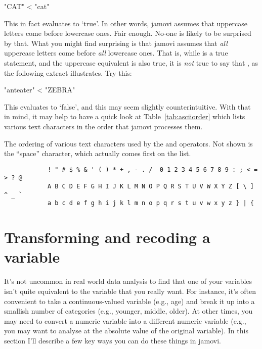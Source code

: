 \begin{rblock1}
"CAT" < "cat"
\end{rblock1}
This in fact evaluates to `true'. In other words, jamovi assumes that uppercase letters come before lowercase ones. Fair enough. No-one is likely to be surprised by that. What you might find surprising is that jamovi assumes that {\it all} uppercase letters come before {\it all} lowercase ones. That is, while  is a true statement, and the uppercase equivalent  is also true, it is {\it not} true to say that , as the following extract illustrates. Try this: 
\begin{rblock1}
"anteater" < "ZEBRA"
\end{rblock1}
This evaluates to `false', and this may seem slightly counterintuitive. With that in mind, it may help to have a quick look at Table~\ref{tab:asciiorder} which lists various text characters in the order that jamovi processes them. 

\begin{table}
\begin{center}
\caption{The ordering of various text characters used by the \rtext{<} and \rtext{>} operators. Not shown is the ``space'' character, which actually comes first on the list.}\tabcapsep
\label{tab:asciiorder}
\begin{verbatim}
            ! " # $ % & ' ( ) * + , - . /  0 1 2 3 4 5 6 7 8 9 : ; < = > ? @ 
            A B C D E F G H I J K L M N O P Q R S T U V W X Y Z [ \ ]  ^ _ ` 
            a b c d e f g h i j k l m n o p q r s t u v w x y z } | {
\end{verbatim}
\HR
\end{center}
\end{table}


\section{Transforming and recoding a variable~\label{sec:transform}}

It's not uncommon in real world data analysis to find that one of your variables isn't quite equivalent to the variable that you really want. For instance, it's often convenient to take a continuous-valued variable (e.g., age) and break it up into a smallish number of categories (e.g., younger, middle, older). At other times, you may need to convert a numeric variable into a different numeric variable (e.g., you may want to analyse at the absolute value of the original variable). In this section I'll describe a few key ways you can do these things in jamovi. 

